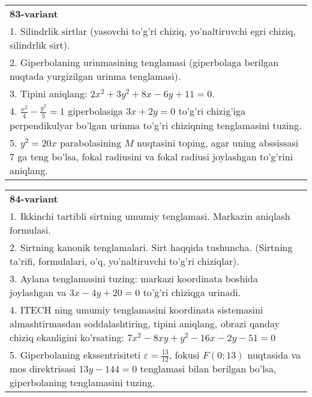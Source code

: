 \documentclass{article}
\begin{document}
\begin{tabular}{m{17cm}}
\textbf{83-variant}\\
1. Silindrlik sirtlar (yasovchi to'g'ri chiziq, yo'naltiruvchi egri chiziq, silindrlik sirt).\\

2. Giperbolaning urinmasining tenglamasi (giperbolaga berilgan nuqtada yurgizilgan urinma tenglamasi).\\

3. Tipini aniqlang: $2x^{2}+3y^{2}+8x-6y+11=0$.\\

4. $\frac{x^{2}}{4} - \frac{y^{2}}{5} = 1$ giperbolasiga $3x + 2y = 0$ to'g'ri chizig'iga perpendikulyar bo'lgan urinma to'g'ri chiziqning tenglamasini tuzing.\\

5. $y^{2} = 20x$ parabolasining $M$ nuqtasini toping, agar uning abssissasi 7 ga teng bo'lsa, fokal radiusini va fokal radiusi joylashgan to'g'rini aniqlang.
\end{tabular}
\vspace{1cm}


\begin{tabular}{m{17cm}}
\textbf{84-variant}\\
1. Ikkinchi tartibli sirtning umumiy tenglamasi. Markazin aniqlash formulasi.\\

2. Sirtning kanonik tenglamalari. Sirt haqqida tushuncha. (Sirtning ta'rifi, formulalari, o'q, yo'naltiruvchi to'g'ri chiziqlar).\\

3. Aylana tenglamasini tuzing: markazi koordinata boshida joylashgan va $3x-4y+20=0$ to'g'ri chiziqga urinadi.\\

4. ITECH ning umumiy tenglamasini koordinata sistemasini almashtirmasdan soddalashtiring, tipini aniqlang, obrazi qanday chiziq ekanligini ko'rsating: $7x^{2} - 8xy + y^{2} - 16x - 2y - 51 = 0$\\

5. Giperbolaning ekssentrisiteti $\varepsilon = \frac{13}{12}$, fokusi $F(0;13)$ nuqtasida va mos direktrisasi $13y - 144 = 0$ tenglamasi bilan berilgan bo'lsa, giperbolaning tenglamasini tuzing.  
\end{tabular}
\vspace{1cm}
\end{document}
